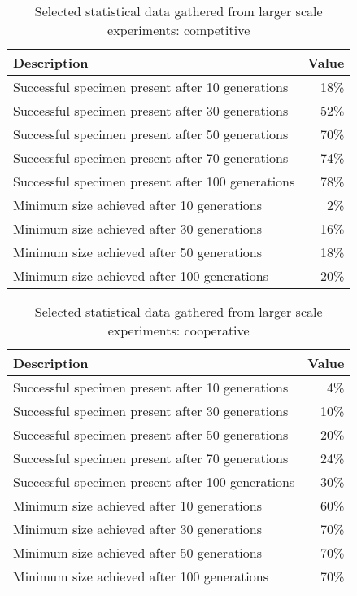 \begin{table} [h]
    \centering
    \begin{tabular} {l r}
        \hline \hline
        Description & Value \\
        \hline
        Successful specimen present after 10 generations & 18\% \\
        Successful specimen present after 30 generations & 52\% \\
        Successful specimen present after 50 generations & 70\% \\
        Successful specimen present after 70 generations & 74\% \\
        Successful specimen present after 100 generations & 78\% \\
        Minimum size achieved after 10 generations & 2\% \\
        Minimum size achieved after 30 generations & 16\% \\
        Minimum size achieved after 50 generations & 18\% \\
        Minimum size achieved after 100 generations & 20\% \\

    \end{tabular}
    \caption{Selected statistical data gathered from larger scale experiments: competitive}
    \label{table:x mass_results_comp}
\end{table}

\begin{table} [h]
    \centering
    \begin{tabular} {l r}
        \hline \hline
        Description & Value \\
        \hline
        Successful specimen present after 10 generations & 4\% \\
        Successful specimen present after 30 generations & 10\% \\
        Successful specimen present after 50 generations & 20\% \\
        Successful specimen present after 70 generations & 24\% \\
        Successful specimen present after 100 generations & 30\% \\
        Minimum size achieved after 10 generations & 60\% \\
        Minimum size achieved after 30 generations & 70\% \\
        Minimum size achieved after 50 generations & 70\% \\
        Minimum size achieved after 100 generations & 70\% \\

    \end{tabular}
    \caption{Selected statistical data gathered from larger scale experiments: cooperative}
    \label{table:x mass_results_coop}
\end{table}
